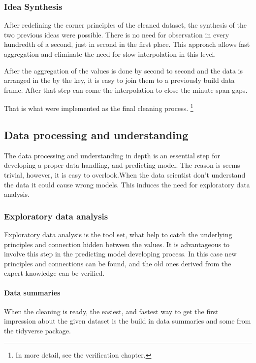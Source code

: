 		\subsubsection{Idea Synthesis}
		After redefining the corner principles of the cleaned dataset, the synthesis of the two previous ideas were possible.
		There is no need for observation in every hundredth of a second, just in second in the first place. This approach allows fast aggregation and eliminate the need for slow interpolation in this level.

		After the aggregation of the values is done by second to second and the data is arranged in the by the key, it is easy to join them to a previously build data frame. After that step can come the interpolation to close the minute span gaps.

		That is what were implemented as the final cleaning process. \footnote{In more detail, see the verification chapter.}
\subsection{Data processing and understanding}
		The data processing and understanding in depth is an essential step for developing a proper data handling, and predicting model.
		The reason is seems trivial, however, it is easy to overlook.When the data scientist don't understand the data it could cause wrong models. This induces the need for exploratory data analysis.
	\subsubsection{Exploratory data analysis}
		Exploratory data analysis is the tool set, what help to catch the underlying principles and connection hidden between the values. It is advantageous to involve this step in the predicting model developing process. In this case new principles and connections can be found, and the old ones derived from the expert knowledge can be verified.
		\paragraph{Data summaries}
		When the cleaning is ready, the easiest, and fastest way to get the first impression about the given dataset is the build in data summaries and some from the tidyverse package.

